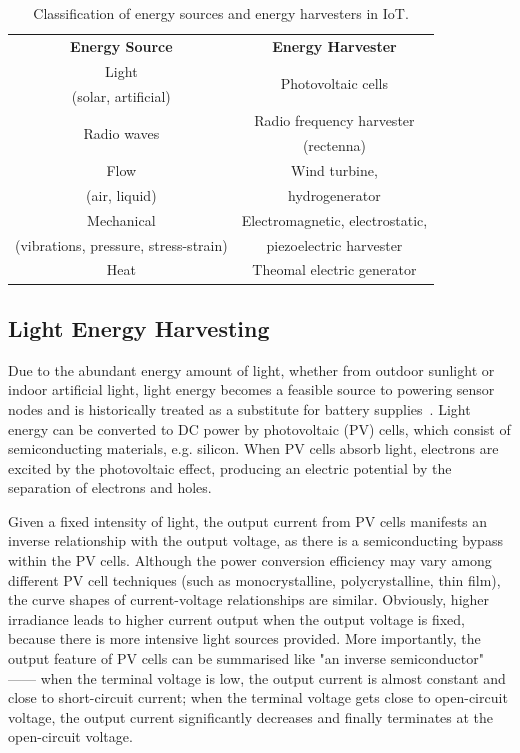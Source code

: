 \begin{table}
    \renewcommand{\arraystretch}{1.2}
    \centering
    \begin{tabular}{|c|c|}
    \hline
    \multirow{2}{*}{\textbf{Energy Source}} & \multirow{2}{*}{\textbf{Energy Harvester}} \\
    & \\ 
    \hline
    Light & \multirow{2}{*}{Photovoltaic cells} \\
    (solar, artificial) & \\ 
    \hline
    \multirow{2}{*}{Radio waves} & Radio frequency harvester \\ 
    & (rectenna) \\ 
    \hline
    Flow & Wind turbine, \\ 
    (air, liquid) & hydrogenerator \\ 
    \hline
    Mechanical & Electromagnetic, electrostatic, \\ 
    (vibrations, pressure, stress-strain) & piezoelectric harvester \\ 
    \hline
    \multirow{2}{*}{Heat} & \multirow{2}{*}{Theomal electric generator} \\
    & \\  
    \hline
    \end{tabular}
    \caption{Classification of energy sources and energy harvesters in IoT.}
    \label{Table:energysources}
\end{table}

\subsection{Light Energy Harvesting}

Due to the abundant energy amount of light, whether from outdoor sunlight or indoor artificial light, light energy becomes a feasible source to powering sensor nodes and is historically treated as a substitute for battery supplies~\cite{raghunathan2005design, seah2009wireless}. Light energy can be converted to DC power by photovoltaic (PV) cells, which consist of semiconducting materials, e.g. silicon. When PV cells absorb light, electrons are excited by the photovoltaic effect, producing an electric potential by the separation of electrons and holes.

Given a fixed intensity of light, the output current from PV cells manifests an inverse relationship with the output voltage, as there is a semiconducting bypass within the PV cells. Although the power conversion efficiency may vary among different PV cell techniques (such as monocrystalline, polycrystalline, thin film), the curve shapes of current-voltage relationships are similar. Obviously, higher irradiance leads to higher current output when the output voltage is fixed, because there is more intensive light sources provided. More importantly, the output feature of PV cells can be summarised like "an inverse semiconductor" ------ when the terminal voltage is low, the output current is almost constant and close to short-circuit current; when the terminal voltage gets close to open-circuit voltage, the output current significantly decreases and finally terminates at the open-circuit voltage. 

